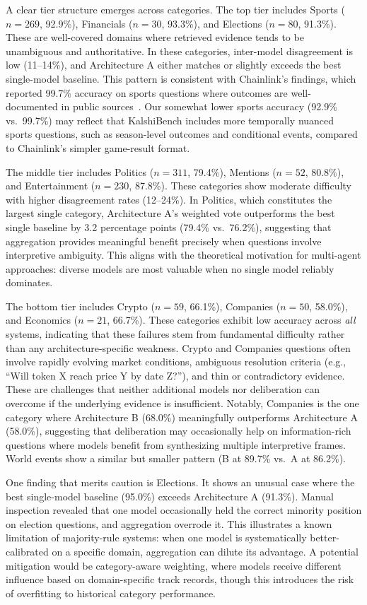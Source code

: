 A clear tier structure emerges across categories. The top tier includes Sports ($n=269$, 92.9\%), Financials ($n=30$, 93.3\%), and Elections ($n=80$, 91.3\%). These are well-covered domains where retrieved evidence tends to be unambiguous and authoritative. In these categories, inter-model disagreement is low (11--14\%), and Architecture A either matches or slightly exceeds the best single-model baseline. This pattern is consistent with Chainlink's findings, which reported 99.7\% accuracy on sports questions where outcomes are well-documented in public sources~\cite{chainlink2025aioracles}. Our somewhat lower sports accuracy (92.9\% vs.\ 99.7\%) may reflect that KalshiBench includes more temporally nuanced sports questions, such as season-level outcomes and conditional events, compared to Chainlink's simpler game-result format.

The middle tier includes Politics ($n=311$, 79.4\%), Mentions ($n=52$, 80.8\%), and Entertainment ($n=230$, 87.8\%). These categories show moderate difficulty with higher disagreement rates (12--24\%). In Politics, which constitutes the largest single category, Architecture A's weighted vote outperforms the best single baseline by 3.2 percentage points (79.4\% vs.\ 76.2\%), suggesting that aggregation provides meaningful benefit precisely when questions involve interpretive ambiguity. This aligns with the theoretical motivation for multi-agent approaches: diverse models are most valuable when no single model reliably dominates.

The bottom tier includes Crypto ($n=59$, 66.1\%), Companies ($n=50$, 58.0\%), and Economics ($n=21$, 66.7\%). These categories exhibit low accuracy across \emph{all} systems, indicating that these failures stem from fundamental difficulty rather than any architecture-specific weakness. Crypto and Companies questions often involve rapidly evolving market conditions, ambiguous resolution criteria (e.g., ``Will token X reach price Y by date Z?''), and thin or contradictory evidence. These are challenges that neither additional models nor deliberation can overcome if the underlying evidence is insufficient. Notably, Companies is the one category where Architecture B (68.0\%) meaningfully outperforms Architecture A (58.0\%), suggesting that deliberation may occasionally help on information-rich questions where models benefit from synthesizing multiple interpretive frames. World events show a similar but smaller pattern (B at 89.7\% vs.\ A at 86.2\%).

One finding that merits caution is Elections. It shows an unusual case where the best single-model baseline (95.0\%) exceeds Architecture A (91.3\%). Manual inspection revealed that one model occasionally held the correct minority position on election questions, and aggregation overrode it. This illustrates a known limitation of majority-rule systems: when one model is systematically better-calibrated on a specific domain, aggregation can dilute its advantage. A potential mitigation would be category-aware weighting, where models receive different influence based on domain-specific track records, though this introduces the risk of overfitting to historical category performance.

